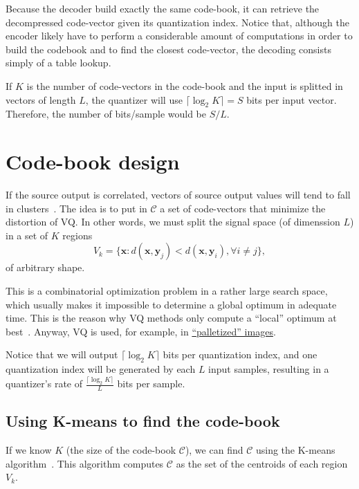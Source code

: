 Because the decoder build exactly the same code-book, it can retrieve
the decompressed code-vector given its quantization index. Notice
that, although the encoder likely have to perform a considerable
amount of computations in order to build the codebook and to find the
closest code-vector, the decoding consists simply of a table lookup.

If $K$ is the number of code-vectors in the code-book and the input is
splitted in vectors of length $L$, the quantizer will use
$\lceil\log_2 K\rceil=S$ bits per input vector. Therefore, the number
of bits/sample would be $S/L$.


\section{Code-book design}

If the source output is correlated, vectors of source output values
will tend to fall in clusters~\cite{sayood2017introduction}. The idea
is to put in $\mathcal{C}$ a set of code-vectors that minimize the
distortion of VQ. In other words, we must split the signal space (of
dimenssion $L$) in a set of $K$ regions
\begin{equation}
  V_k=\{\mathbf{x}:d(\mathbf{x},\mathbf{y}_j) <
  d(\mathbf{x},\mathbf{y}_i), \forall i\ne j\},
\end{equation}
of arbitrary shape.

This is a combinatorial optimization problem in a rather large search
space, which usually makes it impossible to determine a global optimum
in adequate time. This is the reason why VQ methods only compute a
``local'' optimum at best~\cite{burger2016digital}. Anyway, VQ is
used, for example, in
\href{https://en.wikipedia.org/wiki/Palette_(computing)}{``palletized''
  images}.

Notice that we will output $\lceil\log_2 K\rceil$ bits per
quantization index, and one quantization index will be generated by
each $L$ input samples, resulting in a quantizer's rate of
$\frac{\lceil\log_2 K\rceil}{L}$ bits per sample.

  
\subsection{Using K-means to find the code-book}

If we know $K$ (the size of the code-book $\mathcal{C}$), we can find
$\mathcal{C}$ using the K-means
algorithm~\cite{hartigan1979algorithm,sayood2017introduction}. This
algorithm computes $\mathcal{C}$ as the set of the centroids of each
region $V_k$.

